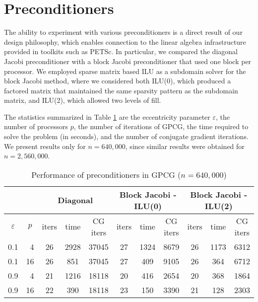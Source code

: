 \documentclass{esub2acm}
\begin{document}
\section{Preconditioners}

\label{sec:preconditioners}

The ability to experiment with various preconditioners is
a direct result of our design philosophy, which enables
connection to the 
linear algebra infrastructure provided in toolkits such as PETSc.
In particular, we compared the diagonal Jacobi
preconditioner with a block Jacobi preconditioner that used
one block per processor.
We employed sparse matrix based ILU as a subdomain solver for the block
Jacobi method, where we considered both ILU(0), which produced a
factored matrix that maintained the same sparsity pattern as the
subdomain matrix, and ILU(2), which allowed two levels of fill.

The statistics summarized in Table \ref{preconditioners}
are the eccentricity parameter $ \varepsilon$,
the number of processors $p$,
the number of iterations of GPCG,
the time required to solve the problem (in seconds),
and the number of conjugate gradient iterations.
We present results only for $ n = 640,000 $, since similar
results were obtained for $ n = 2,560,000 $.

\begin{table}[htbp]
\caption{Performance of preconditioners in GPCG ($ n = 640,000 $)}
\label{preconditioners}
\medskip
\begin{center}
\footnotesize
\begin{tabular}{| c r | c c c | c c c | c c c |}
\cline{3-11}
\multicolumn{2}{c}{} &
\multicolumn{3}{|c|}{Diagonal} &
\multicolumn{3}{c|}{Block Jacobi - ILU(0)} &
\multicolumn{3}{c|}{Block Jacobi - ILU(2)} \\
\hline
\multicolumn{1}{|c}{$ \varepsilon $} & 
\multicolumn{1}{c|}{$ p $} & 
\multicolumn{1}{c}{iters} &
\multicolumn{1}{c}{time} & 
\multicolumn{1}{c|}{CG iters} & 
\multicolumn{1}{c}{iters} &
\multicolumn{1}{c}{time} & 
\multicolumn{1}{c|}{CG iters} & 
\multicolumn{1}{c}{iters} &
\multicolumn{1}{c}{time} &
\multicolumn{1}{c|}{CG iters} \\ \hline
 0.1 &  4 & 26 & 2928 & 37045 & 27  & 1324 & 8679  & 26 & 1173 & 6312 \\
 0.1 & 16 & 26 & 851  & 37045 & 27  & 409  & 9105  & 26 & 364 & 6712 \\
\hline                                             
 0.9 &  4 & 21 & 1216 & 18118 & 20 & 416  & 2654 & 20 & 368 & 1864\\
 0.9 & 16 & 22 & 390  & 18118 & 23 & 150  & 3390 & 21 & 128 & 2303\\
\hline
\end{tabular}
\end{center}
\end{table}
\end{document}
